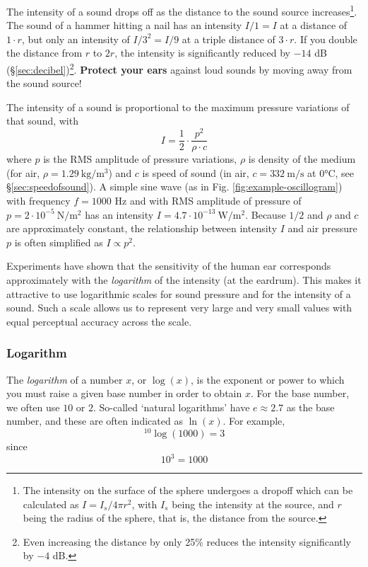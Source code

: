 \documentclass[
]{book}
\begin{document}
The intensity of a sound drops off as the distance to the sound source increases\footnote{The intensity on the surface of the sphere undergoes a dropoff which can be calculated as \(I=I_s/4πr^2\), with \(I_s\) being the intensity at the source, and \(r\) being the radius of the sphere, that is, the distance from the source.}. The sound of a hammer hitting a nail has an intensity \(I/1 = I\) at a distance of \(1 \cdot r\), but only an intensity of \(I /3^2 = I/9\) at a triple distance of \(3 \cdot r\). If you double the distance from \(r\) to \(2r\), the intensity is significantly reduced by \(-14\) dB (§\ref{sec:decibel})\footnote{Even increasing the distance by only 25\% reduces the intensity significantly by \(-4\) dB.}. \textbf{Protect your ears} against loud sounds by moving away from the sound source!

The intensity of a sound is proportional to the maximum pressure variations of that sound, with
\[I = \frac{1}{2} \cdot \frac{p^2}{\rho \cdot c}\]
where \(p\) is the RMS amplitude of pressure variations, \(\rho\) is density of the medium (for air, \(\rho = 1.29\ \textrm{kg}/\textrm{m}^3\)) and \(c\) is speed of sound (in air, \(c = 332\ \textrm{m}/\textrm{s}\) at 0°C, see §\ref{sec:speedofsound}). A simple sine wave (as in Fig. \ref{fig:example-oscillogram}) with frequency \(f=1000\) Hz and with RMS amplitude of pressure of \(p=2 \cdot 10^{-5}\ \textrm{N}/\textrm{m}^2\) has an intensity \(I = 4.7 \cdot 10^{-13}\ \textrm{W}/\textrm{m}^2\).
Because \(1/2\) and \(\rho\) and \(c\) are approximately constant, the relationship between intensity \(I\) and air pressure \(p\) is often simplified as \(I \propto p^2\).

Experiments have shown that the sensitivity of the human ear corresponds approximately with the \emph{logarithm} of the intensity (at the eardrum). This makes it attractive to use logarithmic scales for sound pressure and for the intensity of a sound. Such a scale allows us to represent very large and very small values with equal perceptual accuracy across the scale.

\subsubsection{Logarithm}\label{sec:logarithm}

The \emph{logarithm} of a number \(x\), or \(\log(x)\), is the exponent or power to which you must raise a given base number in order to obtain \(x\). For the base number, we often use \(10\) or \(2\). So-called `natural logarithms' have \(e \approx 2.7\) as the base number, and these are often indicated as \(\ln(x)\). For example,
\[^{10}\log(1000)=3\]
since \[10^3=1000\]
\end{document}
